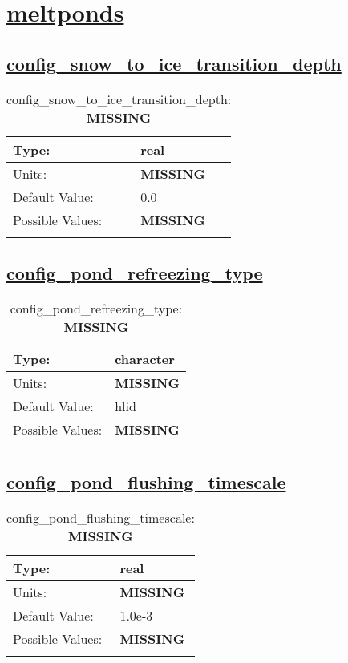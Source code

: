 \section[meltponds]{\hyperref[sec:nm_tab_meltponds]{meltponds}}
\label{sec:nm_sec_meltponds}
\subsection[config\_snow\_to\_ice\_transition\_depth]{\hyperref[sec:nm_tab_meltponds]{config\_snow\_to\_ice\_transition\_depth}}
\label{subsec:nm_sec_config_snow_to_ice_transition_depth}
\begin{center}
\begin{longtable}{| p{2.0in} || p{4.0in} |}
    \hline
    Type: & real \\
    \hline
    Units: & {\bf \color{red} MISSING} \\
    \hline
    Default Value: & 0.0 \\
    \hline
    Possible Values: & {\bf \color{red} MISSING} \\
    \hline
    \caption{config\_snow\_to\_ice\_transition\_depth: {\bf \color{red} MISSING}}
\end{longtable}
\end{center}
\subsection[config\_pond\_refreezing\_type]{\hyperref[sec:nm_tab_meltponds]{config\_pond\_refreezing\_type}}
\label{subsec:nm_sec_config_pond_refreezing_type}
\begin{center}
\begin{longtable}{| p{2.0in} || p{4.0in} |}
    \hline
    Type: & character \\
    \hline
    Units: & {\bf \color{red} MISSING} \\
    \hline
    Default Value: & hlid \\
    \hline
    Possible Values: & {\bf \color{red} MISSING} \\
    \hline
    \caption{config\_pond\_refreezing\_type: {\bf \color{red} MISSING}}
\end{longtable}
\end{center}
\subsection[config\_pond\_flushing\_timescale]{\hyperref[sec:nm_tab_meltponds]{config\_pond\_flushing\_timescale}}
\label{subsec:nm_sec_config_pond_flushing_timescale}
\begin{center}
\begin{longtable}{| p{2.0in} || p{4.0in} |}
    \hline
    Type: & real \\
    \hline
    Units: & {\bf \color{red} MISSING} \\
    \hline
    Default Value: & 1.0e-3 \\
    \hline
    Possible Values: & {\bf \color{red} MISSING} \\
    \hline
    \caption{config\_pond\_flushing\_timescale: {\bf \color{red} MISSING}}
\end{longtable}
\end{center}
